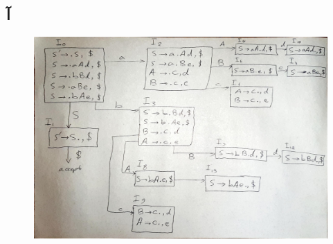 \documentclass{article}
\begin{document}
\section{}%
\subsection{آ}
\begin{figure}[H]
    \centering
    \includegraphics[width=1.0\textwidth]{figures/6.jpg}
    \caption
	{}
    \label{fig:fig1}
\end{figure}
\end{document}

